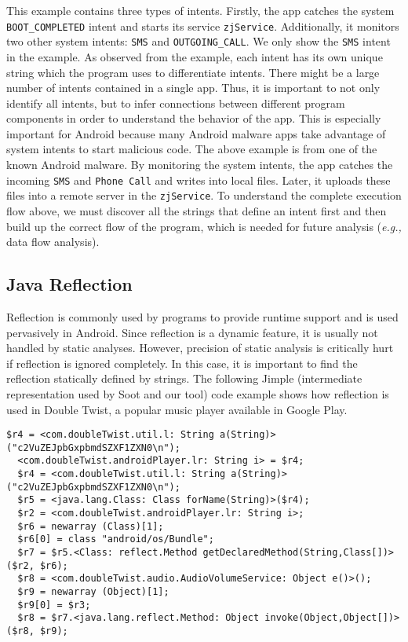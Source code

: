 This example contains three types of intents.
Firstly, the app catches the system \texttt{BOOT\_COMPLETED} intent and starts its service \texttt{zjService}.
Additionally, it monitors two other system intents: \texttt{SMS} and \texttt{OUTGOING\_CALL}. We only show the \texttt{SMS} intent in the example.
As observed from the example, each intent has its own unique string which the program uses to differentiate
intents. There might be a large number of intents contained in a single
app. Thus, it is important to not only identify all intents, but to infer connections between different program components
in order to understand the behavior of the app. This is especially important for Android because
many Android malware apps take advantage of system intents to start malicious code. The above example is from one of the 
known Android malware. By monitoring the system intents, the app catches the incoming \texttt{SMS} and \texttt{Phone Call} and
writes into local files. Later, it uploads these files into a remote server in the \texttt{zjService}.
To understand the complete execution flow above, we must
discover all the strings that define an intent first and then build up the correct flow of the program,
which is needed for future analysis ({\em e.g.,} data flow analysis).

\subsection{Java Reflection}
Reflection is commonly used by programs to provide runtime support and is used pervasively in Android. 
Since reflection is a dynamic feature, it is usually not handled by static analyses. However, precision of static analysis is critically hurt 
if reflection is ignored completely. In this case, it is important to find the reflection statically defined by strings.
The following Jimple (intermediate representation used by Soot and our tool) code example shows how reflection is used in Double Twist,
a popular music player available in Google Play.\\

\begin{lstlisting}[caption={Android Reflection Example}, label=reflectionexample]
  $r4 = <com.doubleTwist.util.l: String a(String)>("c2VuZEJpbGxpbmdSZXF1ZXN0\n");
  <com.doubleTwist.androidPlayer.lr: String i> = $r4;
  $r4 = <com.doubleTwist.util.l: String a(String)>("c2VuZEJpbGxpbmdSZXF1ZXN0\n");
  $r5 = <java.lang.Class: Class forName(String)>($r4);
  $r2 = <com.doubleTwist.androidPlayer.lr: String i>;
  $r6 = newarray (Class)[1];
  $r6[0] = class "android/os/Bundle";
  $r7 = $r5.<Class: reflect.Method getDeclaredMethod(String,Class[])>($r2, $r6);
  $r8 = <com.doubleTwist.audio.AudioVolumeService: Object e()>();
  $r9 = newarray (Object)[1];
  $r9[0] = $r3;
  $r8 = $r7.<java.lang.reflect.Method: Object invoke(Object,Object[])>($r8, $r9);
\end{lstlisting}


